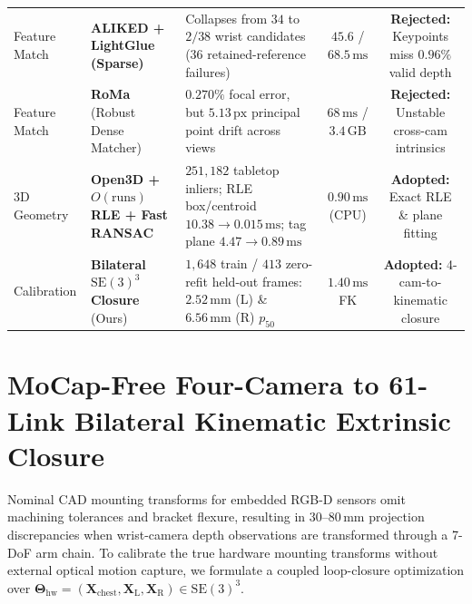 \documentclass[10pt,journal]{IEEEtran}
\begin{document}
\begin{table}[t]
{\begin{tabular}{@{}llp{6.6cm}cc@{}}
        Feature Match & \textbf{ALIKED + LightGlue (Sparse)}~\cite{aliked,lightglue} & Collapses from $34$ to $2/38$ wrist candidates ($36$ retained-reference failures) & $45.6$ / $68.5\,\mathrm{ms}$ & \textbf{Rejected:} Keypoints miss $0.96\%$ valid depth \\
        Feature Match & \textbf{RoMa} (Robust Dense Matcher) & $0.270\%$ focal error, but $5.13\,\mathrm{px}$ principal point drift across views & $68\,\mathrm{ms}$ / $3.4\,\mathrm{GB}$ & \textbf{Rejected:} Unstable cross-cam intrinsics \\
        3D Geometry & \textbf{Open3D + $O(\text{runs})$ RLE + Fast RANSAC} & $251{,}182$ tabletop inliers; RLE box/centroid $10.38 \to 0.015\,\mathrm{ms}$; tag plane $4.47 \to 0.89\,\mathrm{ms}$ & $0.90\,\mathrm{ms}$ (CPU) & \textbf{Adopted:} Exact RLE \& plane fitting \\
        Calibration & \textbf{Bilateral $\mathrm{SE}(3)^3$ Closure} (Ours) & $1{,}648$ train / $413$ zero-refit held-out frames: $2.52\,\mathrm{mm}$ (L) \& $6.56\,\mathrm{mm}$ (R) $p_{50}$ & $1.40\,\mathrm{ms}$ FK & \textbf{Adopted:} 4-cam-to-kinematic closure \\
        \bottomrule
    \end{tabular}}
\end{table}

\section{MoCap-Free Four-Camera to 61-Link Bilateral Kinematic Extrinsic Closure}
\label{app:closure}

Nominal CAD mounting transforms for embedded RGB-D sensors omit machining tolerances and bracket flexure, resulting in $30$--$80\,\mathrm{mm}$ projection discrepancies when wrist-camera depth observations are transformed through a 7-DoF arm chain. To calibrate the true hardware mounting transforms without external optical motion capture, we formulate a coupled loop-closure optimization over $\boldsymbol{\Theta}_{\mathrm{hw}} = (\mathbf{X}_{\mathrm{chest}}, \mathbf{X}_{\mathrm{L}}, \mathbf{X}_{\mathrm{R}}) \in \mathrm{SE}(3)^3$.
\end{document}
